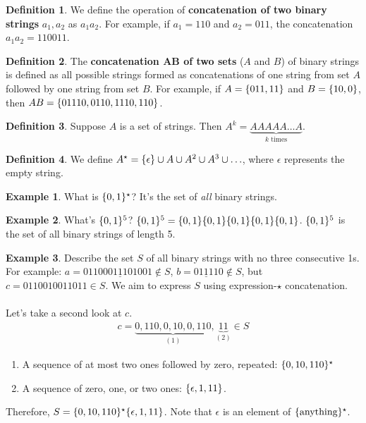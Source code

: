 \documentclass[]{article}
\theoremstyle{definition}
\newtheorem*{defn}{Definition}
\newtheorem{ex}{Example}[section]
\DeclarePairedDelimiter{\set}{\lbrace}{\rbrace}
\begin{document}
		\begin{defn}
			We define the operation of \textbf{concatenation of two binary strings} $a_1, a_2$ as $a_1 a_2$. For example, if $a_1 = 110$ and $a_2 = 011$, the concatenation $a_1 a_2 = 110011$.
		\end{defn}

		\begin{defn}
			The \textbf{concatenation $\mathbf{AB}$ of two sets} ($A$ and $B$) of binary strings is defined as all possible strings formed as concatenations of one string from set $A$ followed by one string from set $B$. For example, if $A = \set{011, 11 }$ and $B = \set{10, 0}$, then $AB = \set{01110, 0110, 1110, 110 }$.
		\end{defn}

		\begin{defn}
			Suppose $A$ is a set of strings. Then $A^k = \underbrace{AAAAA \ldots A}_{k \text{ times}}$.
		\end{defn}

		\begin{defn}
			We define $A^\star = \set{\epsilon } \cup A \cup A^2 \cup A^3 \cup \ldots$, where $\epsilon$ represents the empty string.
		\end{defn}

		\begin{ex}
			What is $\set{0, 1 }^\star$? It's the set of \emph{all} binary strings.
		\end{ex}

		\begin{ex}
			What's $\set{0, 1 }^5$? $\set{0, 1 }^5 = \set{0, 1 } \set{0, 1 } \set{0, 1 } \set{0, 1 } \set{0, 1 }$. $\set{0, 1}^5$ is the set of all binary strings of length 5.
		\end{ex}

		\begin{ex}
			Describe the set $S$ of all binary strings with no three consecutive 1s. For example: $a = 011000\underline{111}01001 \not \in S$, $b = 0\underline{111}10 \not \in S$, but $c = 0110010011011 \in S$. We aim to express $S$ using expression-$\star$ concatenation.
			\\ \\
			Let's take a second look at $c$.
			\begin{align*}
				c = \underbrace{0,110,0,10,0,110}_{(1)},\underbrace{11}_{(2)} \in S
			\end{align*}

			\begin{enumerate}
				\item A sequence of at most two ones followed by zero, repeated: $\set{0, 10, 110 }^\star$
				\item A sequence of zero, one, or two ones: $\set{\epsilon, 1, 11 }$.
			\end{enumerate}

			Therefore, $S = \set{0, 10, 110}^\star \set{\epsilon, 1, 11 }$. Note that $\epsilon$ is an element of $\set{\text{anything} }^\star$.
		\end{ex}
\end{document}

